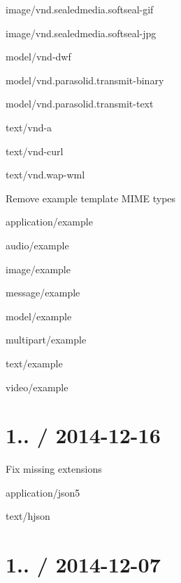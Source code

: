 \begin{DoxyItemize}
\begin{DoxyItemize}
\item {\ttfamily image/vnd.\+sealedmedia.\+softseal-\/gif}
\item {\ttfamily image/vnd.\+sealedmedia.\+softseal-\/jpg}
\item {\ttfamily model/vnd-\/dwf}
\item {\ttfamily model/vnd.\+parasolid.\+transmit-\/binary}
\item {\ttfamily model/vnd.\+parasolid.\+transmit-\/text}
\item {\ttfamily text/vnd-\/a}
\item {\ttfamily text/vnd-\/curl}
\item {\ttfamily text/vnd.\+wap-\/wml}
\end{DoxyItemize}
\item Remove example template M\+I\+M\+E types
\begin{DoxyItemize}
\item {\ttfamily application/example}
\item {\ttfamily audio/example}
\item {\ttfamily image/example}
\item {\ttfamily message/example}
\item {\ttfamily model/example}
\item {\ttfamily multipart/example}
\item {\ttfamily text/example}
\item {\ttfamily video/example}
\end{DoxyItemize}
\end{DoxyItemize}

\section*{1.. / 2014-\/12-\/16 }


\begin{DoxyItemize}
\item Fix missing extensions
\begin{DoxyItemize}
\item {\ttfamily application/json5}
\item {\ttfamily text/hjson}
\end{DoxyItemize}
\end{DoxyItemize}

\section*{1.. / 2014-\/12-\/07 }


